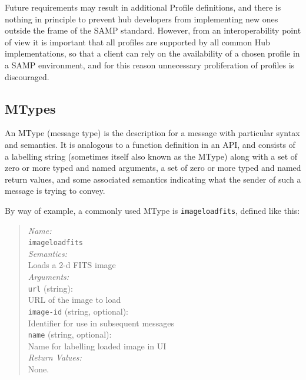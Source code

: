 \documentclass[5p]{elsarticle}
\begin{document}
Future requirements may result in additional Profile definitions,
and there is nothing in principle to prevent hub developers
from implementing new ones outside the frame of the SAMP standard.
However, from an interoperability point of view it is important
that all profiles are supported by all common Hub implementations,
so that a client can rely on the availability of a chosen profile
in a SAMP environment, and for this reason unnecessary proliferation
of profiles is discouraged.



\subsection{MTypes} \label{sec:mtypes}

An MType (message type) is the description for a message with particular
syntax and semantics.
It is analogous to a function definition in an API,
and consists of a labelling string (sometimes itself also known as the MType)
along with
a set of zero or more typed and named arguments,
a set of zero or more typed and named return values,
and some associated semantics indicating what the sender of such a
message is trying to convey.

By way of example,
a commonly used MType is {\tt image{\kdot}load{\kdot}fits},
defined like this:
\begin{quote}
  {\em Name:\/} \\
    \hspace*{1em} {\tt image{\kdot}load{\kdot}fits} \\
  {\em Semantics:\/} \\
    \hspace*{1em} Loads a 2-d FITS image \\
  {\em Arguments:\/} \\
    \hspace*{1em} {\tt url} (string): \\
    \hspace*{2em} URL of the image to load \\
    \hspace*{1em} {\tt image-id} (string, optional): \\
    \hspace*{2em} Identifier for use in subsequent messages \\
    \hspace*{1em} {\tt name} (string, optional): \\
    \hspace*{2em} Name for labelling loaded image in UI \\
  {\em Return Values:\/} \\
    \hspace*{1em} None.
\end{quote}
\end{document}
